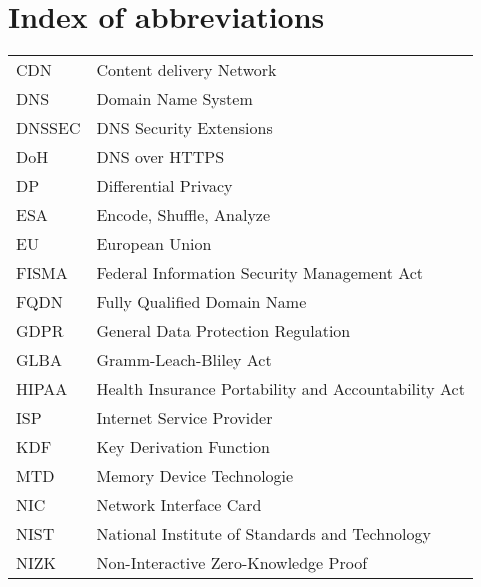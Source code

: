 \chapter*{Index of abbreviations}


\begin{table}
\centering
\begin{tabular}{ll}
CDN & Content delivery Network\\                                                 
DNS & Domain Name System\\                                                       
DNSSEC &  DNS Security Extensions\\                                              
DoH & DNS over HTTPS\\                                                              
DP &    Differential Privacy\\                                                      
ESA & Encode, Shuffle, Analyze\\                                                    
EU &    European Union\\                                                            
FISMA & Federal Information Security Management Act\\                               
FQDN &  Fully Qualified Domain Name\\                                               
GDPR &  General Data Protection Regulation\\                                        
GLBA &  Gramm-Leach-Bliley Act\\                                                    
HIPAA & Health Insurance Portability and Accountability Act\\                       
ISP & Internet Service Provider\\                                                   
KDF & Key Derivation Function\\                                                     
MTD & Memory Device Technologie\\                                                   
NIC & Network Interface Card\\                                                      
NIST &  National Institute of Standards and Technology\\                            
NIZK &  Non-Interactive Zero-Knowledge Proof\\                                      

\end{tabular}
\end{table}
